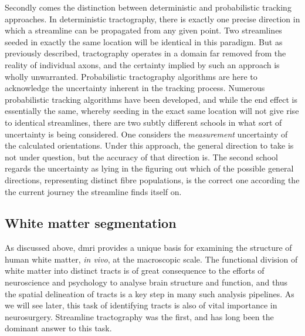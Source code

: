 Secondly comes the distinction between deterministic and probabilistic tracking approaches.
In deterministic tractography, there is exactly one precise direction in which a streamline can be propagated from any given point.
Two streamlines seeded in exactly the same location will be identical in this paradigm.
But as previously described, tractography operates in a domain far removed from the reality of individual axons, and the certainty implied by such an  approach is wholly unwarranted.
Probabilistic tractography algorithms are here to acknowledge the uncertainty inherent in the tracking process.
Numerous probabilistic tracking algorithms have been developed, and while the end effect is essentially the same, whereby seeding in the exact same location will not give rise to identical streamlines, there are two subtly different schools in what sort of uncertainty is being considered.
One considers the \textit{measurement} uncertainty of the calculated orientations.
Under this approach, the general direction to take is not under question, but the accuracy of that direction is.
The second school regards the uncertainty as lying in the figuring out which of the possible general directions, representing distinct fibre populations, is the correct one according the the current journey the streamline finds itself on. 

\subsection{White matter segmentation}

As discussed above, \gls{dmri} provides a unique basis for examining the structure of human white matter, \textit{in vivo}, at the macroscopic scale.
The functional division of white matter into distinct tracts is of great consequence to the efforts of neuroscience and psychology to analyse brain structure and function, and thus the spatial delineation of tracts is a key step in many such analysis pipelines.
As we will see later, this task of identifying tracts is also of vital importance in neurosurgery.
Streamline tractography was the first, and has long been the dominant answer to this task.


